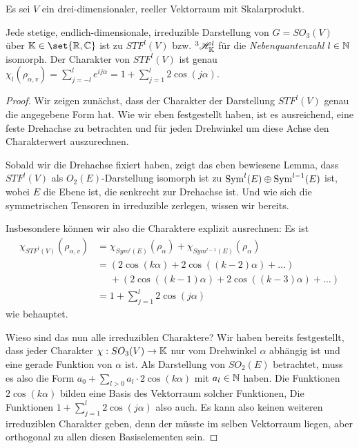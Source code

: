 \begin{theoremdef}
Es sei $V$ ein drei-dimensionaler, reeller Vektorraum mit Skalarprodukt.

Jede stetige, endlich-dimensionale, irreduzible Darstellung von $G=SO_3(V)$ über $\IK\in\set{\IR,\IC}$ ist zu $STF^l(V)$ bzw. ${^3}\mathscr{H}_{\mathbb{K}}^l$ für die \emph{Nebenquantenzahl} $l\in\mathbb{N}$ isomorph. Der Charakter von $STF^l(V)$ ist genau $\chi_l(\rho_{\alpha,v}) = \sum_{j=-l}^l e^{ij\alpha} = 1+\sum_{j=1}^l 2\cos(j\alpha)$. 
\end{theoremdef}
\begin{proof}
Wir zeigen zunächst, dass der Charakter der Darstellung $STF^l(V)$ genau die angegebene Form hat. Wie wir eben festgestellt haben, ist es ausreichend, eine feste Drehachse zu betrachten und für jeden Drehwinkel um diese Achse den Charakterwert auszurechnen.

Sobald wir die Drehachse fixiert haben, zeigt das eben bewiesene Lemma, dass $STF^l(V)$ als $O_2(E)$-Darstellung isomorph ist zu $\operatorname{Sym}^l(E)\oplus \operatorname{Sym}^{l-1}(E)$ ist, wobei $E$ die Ebene ist, die senkrecht zur Drehachse ist. Und wie sich die symmetrischen Tensoren in irreduzible zerlegen, wissen wir bereits.

Insbesondere können wir also die Charaktere explizit ausrechnen: Es ist
\begin{align*}
    \chi_{STF^l(V)}(\rho_{\alpha,v}) &= \chi_{Sym^l(E)}(\rho_\alpha) + \chi_{Sym^{l-1}(E)}(\rho_\alpha) \\
    &= (2\cos(k\alpha)+2\cos((k-2)\alpha)+\ldots) \\ &\phantom{=}+(2\cos((k-1)\alpha)+2\cos((k-3)\alpha) +\ldots) \\
    &= 1+\sum_{j=1}^l 2\cos(j\alpha)
\end{align*}
wie behauptet.

\medbreak
Wieso sind das nun alle irreduziblen Charaktere? Wir haben bereits festgestellt, dass jeder Charakter $\chi: SO_3(V)\to\mathbb{K}$ nur vom Drehwinkel $\alpha$ abhängig ist und eine gerade Funktion von $\alpha$ ist. Als Darstellung von $SO_2(E)$ betrachtet, muss es also die Form $a_0 + \sum_{l>0} a_l\cdot 2\cos(k\alpha)$ mit $a_l\in\mathbb{N}$ haben. Die Funktionen $2\cos(k\alpha)$ bilden eine Basis des Vektorraum solcher Funktionen, Die Funktionen $1+\sum_{j=1}^l 2\cos(j\alpha)$ also auch. Es kann also keinen weiteren irreduziblen Charakter geben, denn der müsste im selben Vektorraum liegen, aber orthogonal zu allen diesen Basiselementen sein.
\end{proof}

